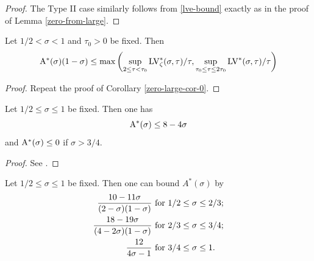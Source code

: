 \begin{proof}
The Type II case similarly follows from \eqref{lve-bound} exactly as in the proof of Lemma \ref{zero-from-large}.
\end{proof}


\begin{corollary}\label{zeroe-large-cor-0} Let $1/2 < \sigma < 1$ and $\tau_0 > 0$ be fixed.  Then
$$ \mathrm{A}^*(\sigma)(1-\sigma) \leq \max \left(\sup_{2 \leq \tau < \tau_0} \mathrm{LV}^*_\zeta(\sigma,\tau)/\tau, \sup_{\tau_0 \leq \tau \leq 2\tau_0} \mathrm{LV}^*(\sigma,\tau)/\tau\right)$$
\end{corollary}

\begin{proof}  Repeat the proof of Corollary \ref{zero-large-cor-0}.
\end{proof}

\begin{proposition}\label{zeroe-lindelof}  Let $1/2 \leq \sigma \leq 1$ be fixed.  Then one has
    $$ \mathrm{A}^*(\sigma) \leq 8 - 4\sigma$$
    and $\mathrm{A}^*(\sigma) \leq 0$ if $\sigma > 3/4$.
\end{proposition}

\begin{proof} See \cite[Lemma 4]{heath_brown_consecutive_II}.
\end{proof}

\begin{theorem}\label{hb-energy-bound}\cite[Theorem 2]{heathbrown_zero_1979}  Let $1/2 \leq \sigma \leq 1$ be fixed.  Then one can bound $A^*(\sigma)$ by
    \begin{align*}
        \frac{10-11\sigma}{(2-\sigma)(1-\sigma)} & \hbox{ for } 1/2 \leq \sigma \leq 2/3;\\
        \frac{18-19\sigma}{(4-2\sigma)(1-\sigma)} & \hbox{ for } 2/3 \leq \sigma \leq 3/4;\\
        \frac{12}{4\sigma-1} & \hbox{ for } 3/4 \leq \sigma \leq 1.
    \end{align*}
\end{theorem}

